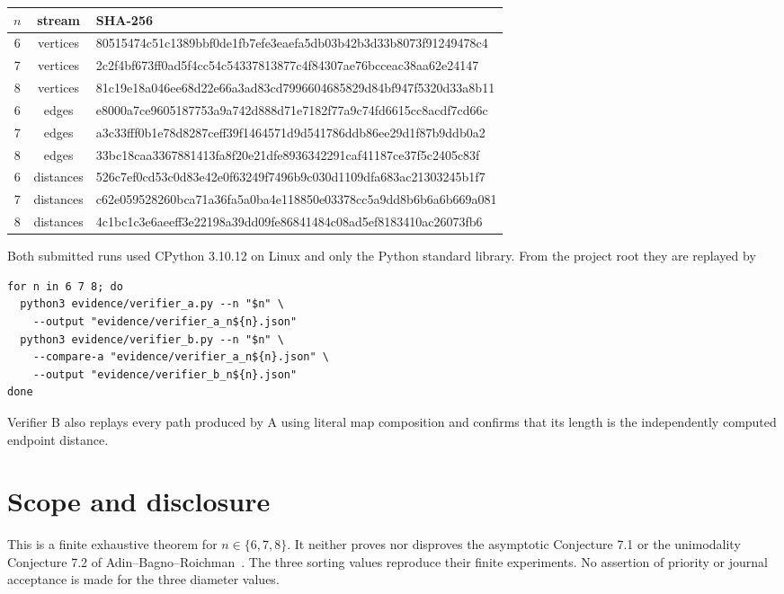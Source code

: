 \documentclass[11pt]{article}
\begin{document}
\begin{center}\scriptsize\ttfamily
\begin{tabular}{ccl}
\toprule
$n$&stream&SHA-256\\
\midrule
6&vertices&80515474c51c1389bbf0de1fb7efe3eaefa5db03b42b3d33b8073f91249478c4\\
7&vertices&2c2f4bf673ff0ad5f4cc54c54337813877c4f84307ae76bcceac38aa62e24147\\
8&vertices&81c19e18a046ee68d22e66a3ad83cd7996604685829d84bf947f5320d33a8b11\\
6&edges&e8000a7ce9605187753a9a742d888d71e7182f77a9c74fd6615cc8acdf7cd66c\\
7&edges&a3c33fff0b1e78d8287ceff39f1464571d9d541786ddb86ee29d1f87b9ddb0a2\\
8&edges&33bc18caa3367881413fa8f20e21dfe8936342291caf41187ce37f5c2405c83f\\
6&distances&526c7ef0cd53c0d83e42e0f63249f7496b9c030d1109dfa683ac21303245b1f7\\
7&distances&c62e059528260bca71a36fa5a0ba4e118850e03378cc5a9dd8b6b6a6b669a081\\
8&distances&4c1bc1c3e6aeeff3e22198a39dd09fe86841484c08ad5ef8183410ac26073fb6\\
\bottomrule
\end{tabular}
\end{center}

Both submitted runs used CPython 3.10.12 on Linux and only the Python standard
library.  From the project root they are replayed by
\begin{verbatim}
for n in 6 7 8; do
  python3 evidence/verifier_a.py --n "$n" \
    --output "evidence/verifier_a_n${n}.json"
  python3 evidence/verifier_b.py --n "$n" \
    --compare-a "evidence/verifier_a_n${n}.json" \
    --output "evidence/verifier_b_n${n}.json"
done
\end{verbatim}
Verifier B also replays every path produced by A using literal map composition
and confirms that its length is the independently computed endpoint distance.

\section{Scope and disclosure}

This is a finite exhaustive theorem for $n\in\{6,7,8\}$.  It neither proves
nor disproves the asymptotic Conjecture 7.1 or the unimodality Conjecture 7.2 of
Adin--Bagno--Roichman~\cite{AdinBagnoRoichman2026}.  The three sorting values
reproduce their finite experiments.  No assertion of priority or journal
acceptance is made for the three diameter values.
\end{document}
